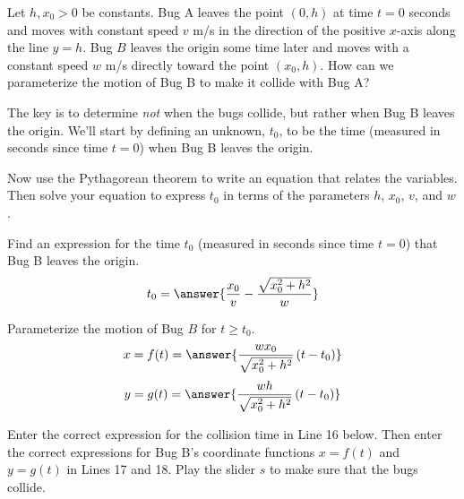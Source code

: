 \documentclass{ximera}
\begin{document}
\begin{example}   \label{Ex5}
Let $h,x_0>0$ be constants. Bug A leaves the point $(0,h)$ at time $t=0$ seconds and moves with constant speed $v$ m/s in the direction of the positive $x$-axis along the line $y=h$. Bug $B$ leaves the origin some time later and moves with a constant speed $w$ m/s directly toward the point $(x_0,h)$.  How can we parameterize the motion of Bug B to make it collide with Bug A?
\end{example}

\begin{explanation}
The key is to determine \emph{not} when the bugs collide, but rather when Bug B leaves the origin. We'll start by defining an unknown, $t_0$, to be the time (measured in seconds since time $t=0$) when Bug B leaves the origin. 

Now use the Pythagorean theorem to write an equation that relates the variables. Then solve your equation to express $t_0$ in terms of the parameters $h$, $x_0$, $v$, and $w$.


\begin{question}
 Find an expression for the time $t_0$ (measured in seconds since time $t=0$) that Bug B leaves the origin. %
\[
        t_0   =  \answer{\frac{x_0}{v} - \frac{\sqrt{x_0^2+h^2}}{w}}
\]
    \end{question}


\begin{question}
Parameterize the motion of Bug $B$ for $t\geq t_0$.
\[
        x = f(t)   =  \answer{\frac{wx_0}{\sqrt{x_0^2+h^2}}\left( t - t_0  \right)}
\]
\[
      y = g(t) =  \answer{\frac{wh}{\sqrt{x_0^2+h^2}}\left( t - t_0  \right)}
\]
    \end{question}

\begin{exploration}\label{exp:pc1c}
Enter the correct expression for the collision time in Line 16 below. Then enter the correct expressions for Bug B's coordinate functions $x=f(t)$ and $y=g(t)$ in Lines 17 and 18. Play the slider $s$ to make sure that the bugs collide.

 
\begin{onlineOnly}
    \begin{center}
\end{center}
\end{onlineOnly}
\end{exploration}


\end{explanation}
\end{document}

